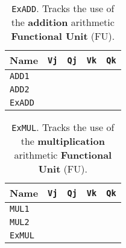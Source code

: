 \begin{enumerate}
    \newpage

    \begin{table}[!htp]
        \centering
        \begin{tabular}{@{} l | c c c c @{}}
            \toprule
            Name            & \texttt{Vj}   & \texttt{Qj}   & \texttt{Vk}           & \texttt{Qk}   \\
            \midrule
            \texttt{ADD1}   &               &               &                       &               \\ [.3em]
            \texttt{ADD2}   &               &               &                       &               \\
            \cmidrule{1-5}
            \texttt{ExADD}  &               &               &                       &               \\
            \bottomrule
        \end{tabular}
        \caption*{\texttt{ExADD}. Tracks the use of the \textbf{addition} arithmetic \textbf{Functional Unit} (FU).}
    \end{table}

    \begin{table}[!htp]
        \centering
        \begin{tabular}{@{} l | c c c c @{}}
            \toprule
            Name            & \texttt{Vj}   & \texttt{Qj}   & \texttt{Vk}           & \texttt{Qk}   \\
            \midrule
            \texttt{MUL1}   &               &               &                       &               \\ [.3em]
            \texttt{MUL2}   &               &               &                       &               \\
            \cmidrule{1-5}
            \texttt{ExMUL}  &               &               &                       &               \\
            \bottomrule
        \end{tabular}
        \caption*{\texttt{ExMUL}. Tracks the use of the \textbf{multiplication} arithmetic \textbf{Functional Unit} (FU).}
    \end{table}


\end{enumerate}
